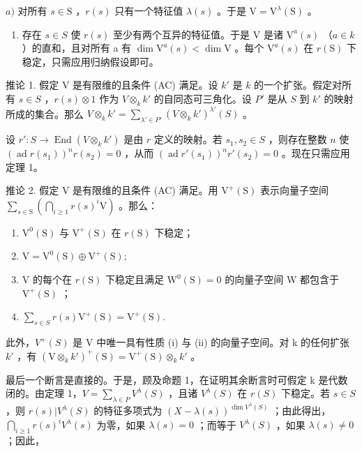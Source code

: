 \(a)\) 对所有 \(s \in \mathrm{S}\) ，\(r(s)\) 只有一个特征值 \(\lambda(s)\) 。于是 \(\mathrm{V} = \mathrm{V}^{\lambda}(\mathrm{S})\) 。

\begin{enumerate}
\def\labelenumi{\alph{enumi})}
\setcounter{enumi}{1}
\tightlist
\item
  存在 \(s \in S\) 使 \(r(s)\) 至少有两个互异的特征值。于是 V 是诸 \(\mathrm{V}^{a}(s)\) （\(a \in k\) ）的直和，且对所有 a 有 \(\dim \mathrm{V}^{a}(s) < \dim \mathrm{V}\) 。每个 \(\mathrm{V}^{a}(s)\) 在 \(r(\mathrm{S})\) 下稳定，只需应用归纳假设即可。
\end{enumerate}

推论 1. 假定 V 是有限维的且条件 (AC) 满足。设 \(k'\) 是 \(k\) 的一个扩张。假定对所有 \(s \in S\) ，\(r(s) \otimes 1\) 作为 \(V \otimes_k k'\) 的自同态可三角化。设 \(P'\) 是从 \(S\) 到 \(k'\) 的映射所成的集合。那么 \(V \otimes_k k' = \sum_{\lambda' \in P'} (V \otimes_k k')^{\lambda'}(S)\) 。

设 \(r': S \to \operatorname{End}(V \otimes_k k')\) 是由 \(r\) 定义的映射。若 \(s_1, s_2 \in S\) ，则存在整数 \(n\) 使 \((\operatorname{ad} r(s_1))^n r(s_2) = 0\) ，从而 \((\operatorname{ad} r'(s_1))^n r'(s_2) = 0\) 。现在只需应用定理 1。

推论 2. 假定 V 是有限维的且条件 (AC) 满足。用 \(\mathrm{V}^{+}(\mathrm{S})\) 表示向量子空间 \(\sum_{s\in \mathrm{S}}\left(\bigcap_{i\geq 1}r(s)^{i}\mathrm{V}\right)\) 。那么：

\begin{enumerate}
\def\labelenumi{(\roman{enumi})}
\item
  \(\mathrm{V}^0 (\mathrm{S})\) 与 \(\mathrm{V^{+}(S)}\) 在 \(r(\mathrm{S})\) 下稳定；
\item
  \(\mathrm{V} = \mathrm{V}^{0}(\mathrm{S}) \oplus \mathrm{V}^{+}(\mathrm{S});\)
\item
  V 的每个在 \(r(\mathrm{S})\) 下稳定且满足 \(\mathrm{W}^0 (\mathrm{S}) = 0\) 的向量子空间 W 都包含于 \(\mathrm{V}^{+}(\mathrm{S})\) ；
\item
  \(\sum_{s\in S}r(s)\mathrm{V}^{+}(\mathrm{S}) = \mathrm{V}^{+}(\mathrm{S}).\)
\end{enumerate}

此外，\(V^{+}(S)\) 是 V 中唯一具有性质 (i) 与 (ii) 的向量子空间。对 k 的任何扩张 \(k'\) ，有 \((\mathrm{V} \otimes_{k} k')^{+}(\mathrm{S}) = \mathrm{V}^{+}(\mathrm{S}) \otimes_{k} k'\) 。

最后一个断言是直接的。于是，顾及命题 1，在证明其余断言时可假定 k 是代数闭的。由定理 1，\(V = \sum_{\lambda \in P} V^{\lambda}(S)\) ，且诸 \(V^{\lambda}(S)\) 在 \(r(S)\) 下稳定。若 \(s \in S\) ，则 \(r(s)|V^{\lambda}(S)\) 的特征多项式为 \((X - \lambda(s))^{\dim V^{\lambda}(S)}\) ；由此得出，\(\bigcap_{i \geq 1} r(s)^{i} V^{\lambda}(s)\) 为零，如果 \(\lambda(s) = 0\) ；而等于 \(V^{\lambda}(S)\) ，如果 \(\lambda(s) \neq 0\) ；因此，

